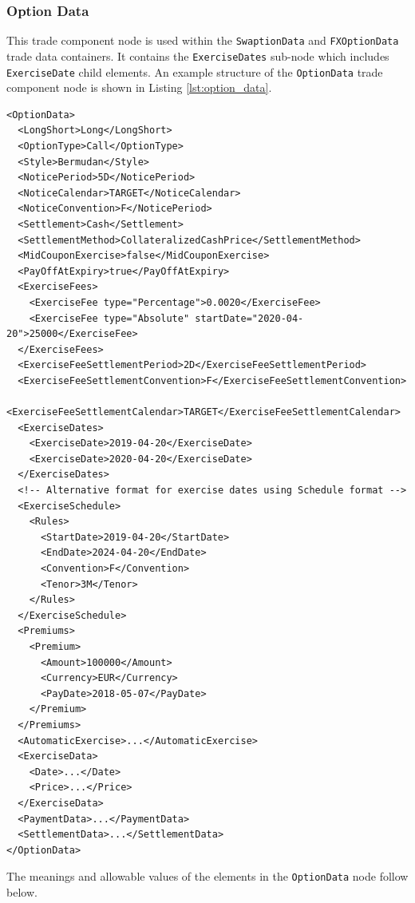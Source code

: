 \subsubsection{Option Data}
\label{ss:option_data}
This trade component node is used within the \lstinline!SwaptionData! and \lstinline!FXOptionData! trade data
containers. It contains the \lstinline!ExerciseDates! sub-node which includes \lstinline!ExerciseDate! child
elements. An example structure of the \lstinline!OptionData! trade component node is shown in Listing
\ref{lst:option_data}.

\begin{listing}[H]
\begin{verbatim}
<OptionData>
  <LongShort>Long</LongShort>
  <OptionType>Call</OptionType>
  <Style>Bermudan</Style>
  <NoticePeriod>5D</NoticePeriod>
  <NoticeCalendar>TARGET</NoticeCalendar>
  <NoticeConvention>F</NoticePeriod>
  <Settlement>Cash</Settlement>
  <SettlementMethod>CollateralizedCashPrice</SettlementMethod>
  <MidCouponExercise>false</MidCouponExercise>
  <PayOffAtExpiry>true</PayOffAtExpiry>
  <ExerciseFees>
    <ExerciseFee type="Percentage">0.0020</ExerciseFee>
    <ExerciseFee type="Absolute" startDate="2020-04-20">25000</ExerciseFee>
  </ExerciseFees>
  <ExerciseFeeSettlementPeriod>2D</ExerciseFeeSettlementPeriod>
  <ExerciseFeeSettlementConvention>F</ExerciseFeeSettlementConvention>
  <ExerciseFeeSettlementCalendar>TARGET</ExerciseFeeSettlementCalendar>
  <ExerciseDates>
    <ExerciseDate>2019-04-20</ExerciseDate>
    <ExerciseDate>2020-04-20</ExerciseDate>
  </ExerciseDates>
  <!-- Alternative format for exercise dates using Schedule format -->
  <ExerciseSchedule>
    <Rules>
      <StartDate>2019-04-20</StartDate>
      <EndDate>2024-04-20</EndDate>
      <Convention>F</Convention>
      <Tenor>3M</Tenor>
    </Rules>
  </ExerciseSchedule>
  <Premiums>
    <Premium>
      <Amount>100000</Amount>
      <Currency>EUR</Currency>
      <PayDate>2018-05-07</PayDate>
    </Premium>
  </Premiums>
  <AutomaticExercise>...</AutomaticExercise>
  <ExerciseData>
    <Date>...</Date>
    <Price>...</Price>
  </ExerciseData>
  <PaymentData>...</PaymentData>
  <SettlementData>...</SettlementData>
</OptionData>
\end{verbatim}
\caption{Option data}
\label{lst:option_data}
\end{listing}

The meanings and allowable values of the elements in the \lstinline!OptionData! node follow below.

